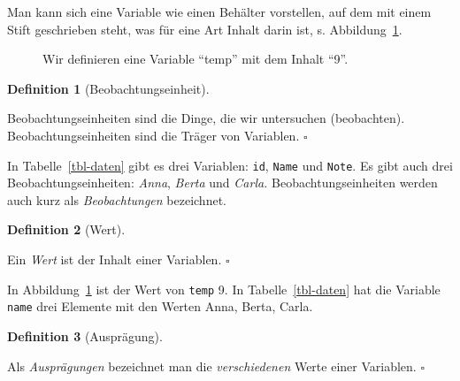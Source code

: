 \documentclass[
  letterpaper,
  oneside,
  open=any]{scrbook}
\theoremstyle{definition}
\theoremstyle{definition}
\theoremstyle{definition}
\newtheorem{definition}{Definition}[chapter]
\theoremstyle{remark}
\begin{document}
Man kann sich eine Variable wie einen Behälter vorstellen, auf dem mit
einem Stift geschrieben steht, was für eine Art Inhalt darin ist, s.
Abbildung~\ref{fig-var-zuweisen}.

\begin{figure}


\caption{\label{fig-var-zuweisen}Wir definieren eine Variable
\enquote{temp} mit dem Inhalt \enquote{9}.}

\end{figure}%

\begin{definition}[Beobachtungseinheit]\protect\hypertarget{def-beobeinheit}{}\label{def-beobeinheit}

Beobachtungseinheiten sind die Dinge, die wir untersuchen (beobachten).
Beobachtungseinheiten sind die Träger von Variablen. \(\square\)

\end{definition}

In Tabelle~\ref{tbl-daten} gibt es drei Variablen: \texttt{id},
\texttt{Name} und \texttt{Note}. Es gibt auch drei
Beobachtungseinheiten: \emph{Anna}, \emph{Berta} und \emph{Carla.}
Beobachtungseinheiten werden auch kurz als \emph{Beobachtungen}
bezeichnet.

\begin{definition}[Wert]\protect\hypertarget{def-wert}{}\label{def-wert}

Ein \emph{Wert} ist der Inhalt einer Variablen. \(\square\)

\end{definition}

In Abbildung~\ref{fig-var-zuweisen} ist der Wert von \texttt{temp} 9. In
Tabelle~\ref{tbl-daten} hat die Variable \texttt{name} drei Elemente mit
den Werten Anna, Berta, Carla.

\begin{definition}[Ausprägung]\protect\hypertarget{def-auspraegung}{}\label{def-auspraegung}

Als \emph{Ausprägungen} bezeichnet man die \emph{verschiedenen} Werte
einer Variablen. \(\square\)

\end{definition}
\end{document}
